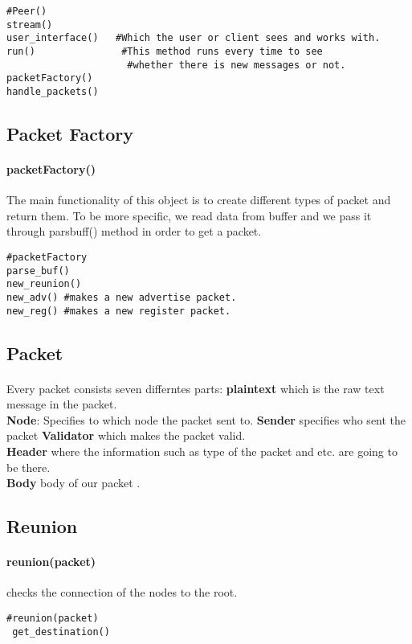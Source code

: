 \documentclass{article}
\begin{document}
\begin{lstlisting}
#Peer()
stream()
user_interface()   #Which the user or client sees and works with. 
run() 				#This method runs every time to see 
				     #whether there is new messages or not.
packetFactory()
handle_packets()
\end{lstlisting}
\subsection{Packet Factory}
\paragraph{packetFactory()}The main functionality of this object is to create different types of packet and return them. To be more specific, we read data from buffer and we pass it through pars\underline{\hspace{.05in}}buff() method in order to get a packet.
\begin{lstlisting}
#packetFactory
parse_buf()
new_reunion()
new_adv() #makes a new advertise packet.
new_reg() #makes a new register packet.
\end{lstlisting}
\subsection{Packet}
\paragraph{}Every packet consists seven differntes parts: \textbf{plain\underline{\hspace{.05in}}text} which is the raw text message in the packet.\\
\textbf{Node}: Specifies to which node the packet sent to. \textbf{Sender} specifies who sent the packet \textbf{Validator} which makes the packet valid.\\ \textbf{Header} where the information such as type of the packet and etc. are going to be there.\\ \textbf{Body} body of our packet .
\subsection{Reunion}
\paragraph{reunion(packet)} checks the connection of the nodes to the root.
\begin{lstlisting}
#reunion(packet)
 get_destination()
\end{lstlisting}
\end{document}
